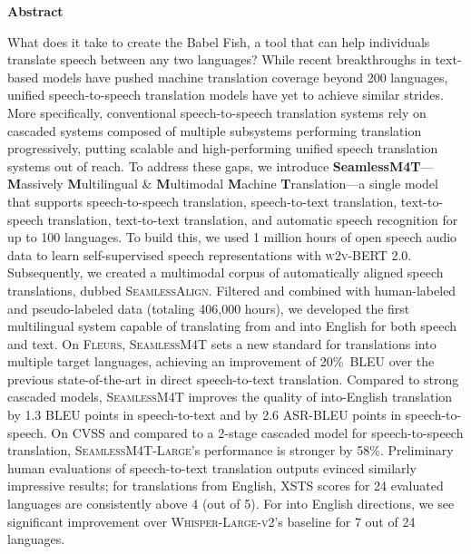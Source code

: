 \documentclass[twoside,11pt]{article}
\newcommand{\mineddata}{\textsc{SeamlessAlign}\xspace}
\newcommand{\mfourt}{\textsc{SeamlessM4T}\xspace}
\newcommand{\mfourtlg}{\textsc{SeamlessM4T-Large}\xspace}
\newcommand{\bleu}{\textsc{BLEU}\xspace}
\newcommand{\asrbleu}{\textsc{ASR-BLEU}\xspace}
\newcommand{\fleurs}{\textsc{Fleurs}\xspace}
\newcommand{\cvss}{\textsc{CVSS}\xspace}
\newcommand{\whisperlarge}{\textsc{Whisper-Large-v2}\xspace}
\newcommand{\wvbert}{\textsc{w2v-BERT 2.0}\xspace}
\newcommand{\stgainoveraudiopalm}{20\%}
\newcommand{\sstgaincvss}{58\%}
\begin{document}
\renewcommand*{\thefootnote}{\fnsymbol{footnote}}


\renewcommand*{\thefootnote}{\arabic{footnote}}
\setcounter{footnote}{0}

\textbf{Abstract}

What does it take to create the Babel Fish, a tool that can help individuals translate speech between any two languages? While recent breakthroughs in text-based models have pushed machine translation coverage beyond 200 languages, unified speech-to-speech translation models have yet to achieve similar strides. 
More specifically, conventional speech-to-speech translation systems rely on cascaded systems composed of multiple subsystems performing translation progressively, putting scalable and high-performing unified speech translation systems out of reach. 
To address these gaps, we introduce \textbf{SeamlessM4T}—\textbf{M}assively \textbf{M}ultilingual \& \textbf{M}ultimodal \textbf{M}achine \textbf{T}ranslation—a single model that supports
speech-to-speech translation, 
speech-to-text translation, 
text-to-speech translation,
text-to-text translation, 
and automatic speech recognition for up to 100 languages. 
To build this, we used 1 million hours of open speech audio data to learn self-supervised speech representations with \wvbert.
Subsequently, we created a multimodal corpus of automatically aligned speech translations, dubbed \mineddata.
Filtered and combined with human-labeled and pseudo-labeled data (totaling 406,000 hours), we developed the first multilingual system capable of translating from and into English for both speech and text.
On \fleurs, \mfourt sets a new standard for translations into multiple target languages, achieving an improvement of \stgainoveraudiopalm~\bleu over the previous state-of-the-art in direct speech-to-text translation.
Compared to strong cascaded models, \mfourt improves the quality of into-English translation by 1.3 \bleu points in speech-to-text and by 2.6 \asrbleu points %
in speech-to-speech.
On \cvss and compared to a 2-stage cascaded model for speech-to-speech translation, \mfourtlg's performance is stronger by \sstgaincvss.
Preliminary human evaluations of speech-to-text translation outputs evinced similarly impressive results; for translations from English, XSTS scores for 24 evaluated languages are consistently above 4 (out of 5). For into English directions, we see significant improvement over \whisperlarge's baseline for 7 out of 24 languages.
\end{document}
